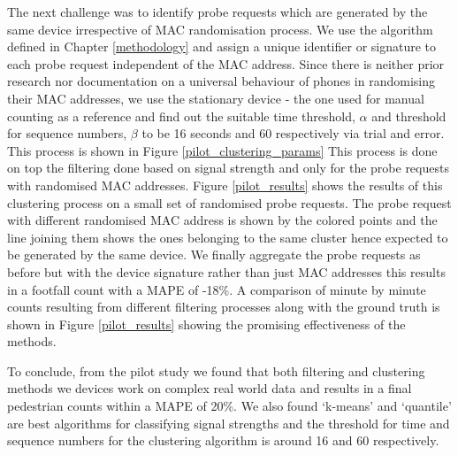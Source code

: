 The next challenge was to identify probe requests which are generated by the
same device irrespective of MAC randomisation process.  We use the algorithm
defined in Chapter \ref{methodology} and assign a unique identifier or signature
to each probe request independent of the MAC address.  Since there is neither
prior research nor documentation on a universal behaviour of phones in
randomising their MAC addresses, we use the stationary device - the one used for
manual counting as a reference and find out the suitable time threshold,
$\alpha$ and threshold for sequence numbers, $\beta$ to be 16 seconds and 60
respectively via trial and error. This process is shown in Figure
\ref{pilot_clustering_params} This process is done on top the filtering done
based on signal strength and only for the probe requests with randomised MAC
addresses.  Figure \ref{pilot_results} shows the results of this clustering
process on a small set of randomised probe requests.  The probe request with
different randomised MAC address is shown by the colored points and the line
joining them shows the ones belonging to the same cluster hence expected to be
generated by the same device.  We finally aggregate the probe requests as before
but with the device signature rather than just MAC addresses this results in a
footfall count with a MAPE of -18\%.  A comparison of minute by minute counts
resulting from different filtering processes along with the ground truth is
shown in Figure \ref{pilot_results} showing the promising effectiveness of the
methods.

To conclude, from the pilot study we found that both filtering and clustering
methods we devices work on complex real world data and results in a final
pedestrian counts within a MAPE of 20\%. We also found `k-means' and `quantile'
are best algorithms for classifying signal strengths and the threshold for time
and sequence numbers for the clustering algorithm is around 16 and 60
respectively.
